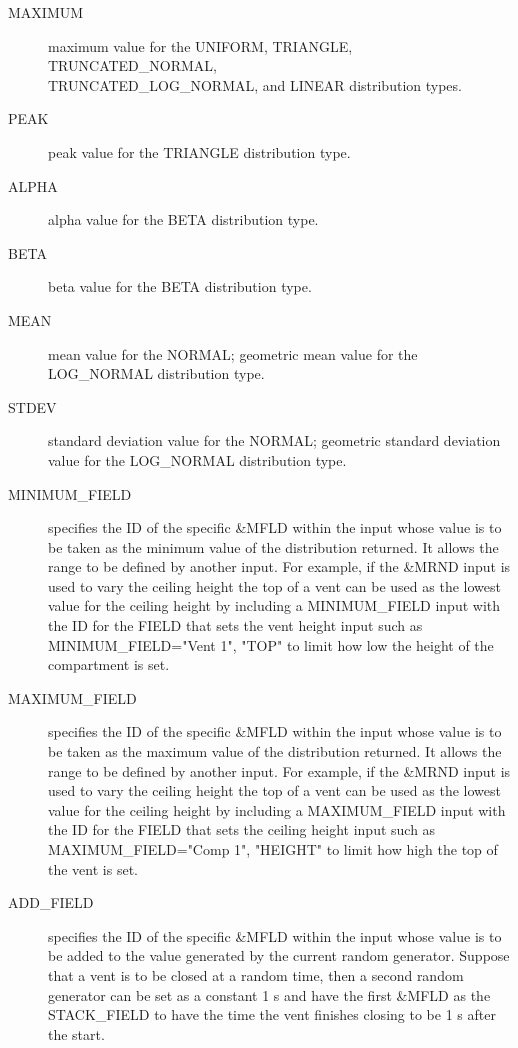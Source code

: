 \documentclass[12pt,twoside]{book}
\begin{document}
\begin{description}
  \item[MAXIMUM] maximum value for the {\ct UNIFORM}, {\ct TRIANGLE}, {\ct TRUNCATED\_NORMAL}, \\
  {\ct TRUNCATED\_LOG\_NORMAL}, and {\ct LINEAR} distribution types.
  \item[PEAK] peak value for the {\ct TRIANGLE} distribution type.
  \item[ALPHA] alpha value for the {\ct BETA} distribution type.
  \item[BETA] beta value for the {\ct BETA} distribution type.
  \item[MEAN] mean value for the {\ct NORMAL}; geometric mean value for the {\ct LOG\_NORMAL} distribution type.
  \item[STDEV] standard deviation value for the {\ct NORMAL}; geometric standard deviation value for the {\ct LOG\_NORMAL} distribution type.
  \item[MINIMUM\_FIELD] specifies the ID of the specific \&MFLD within the input whose value is to be taken as the minimum value of the distribution returned. It allows the range to be defined by another input. For example, if the {\ct \&MRND} input is used to vary the ceiling height the top of a vent can be used as the lowest value for the ceiling height by including a {\ct MINIMUM\_FIELD} input with the {\ct ID} for the {\ct FIELD} that sets the vent height input such as {\ct MINIMUM\_FIELD="Vent 1", "TOP"} to limit how low the height of the compartment is set.
  \item[MAXIMUM\_FIELD] specifies the  ID of the specific \&MFLD  within the input whose value is to be taken as the maximum value of the distribution returned. It allows the range to be defined by another input. For example, if the {\ct \&MRND} input is used to vary the ceiling height the top of a vent can be used as the lowest value for the ceiling height by including a {\ct MAXIMUM\_FIELD} input with the {\ct ID} for the {\ct FIELD} that sets the ceiling height input such as {\ct MAXIMUM\_FIELD="Comp 1", "HEIGHT"} to limit how high the top of the vent is set.
  \item[ADD\_FIELD] specifies the  ID of the specific \&MFLD  within the input whose value is to be added to the value generated by the current random generator. Suppose that a vent is to be closed at a random time, then a second random generator can be set as a constant 1 s and have the first \&MFLD as the STACK\_FIELD  to have the time the vent finishes closing to be 1 s after the start.
\end{description}
\end{document}
